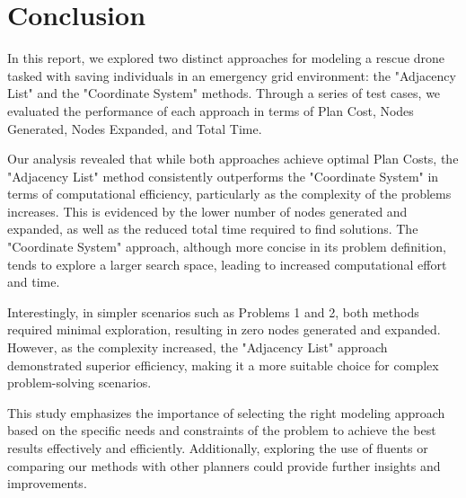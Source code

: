 \documentclass{article}
\begin{document}
\section{Conclusion}

In this report, we explored two distinct approaches for modeling a rescue drone tasked with saving individuals in an emergency grid environment: the "Adjacency List" and the "Coordinate System" methods. Through a series of test cases, we evaluated the performance of each approach in terms of Plan Cost, Nodes Generated, Nodes Expanded, and Total Time.

\vspace{1em}

Our analysis revealed that while both approaches achieve optimal Plan Costs, the "Adjacency List" method consistently outperforms the "Coordinate System" in terms of computational efficiency, particularly as the complexity of the problems increases. This is evidenced by the lower number of nodes generated and expanded, as well as the reduced total time required to find solutions. The "Coordinate System" approach, although more concise in its problem definition, tends to explore a larger search space, leading to increased computational effort and time.

\vspace{1em}

Interestingly, in simpler scenarios such as Problems 1 and 2, both methods required minimal exploration, resulting in zero nodes generated and expanded. However, as the complexity increased, the "Adjacency List" approach demonstrated superior efficiency, making it a more suitable choice for complex problem-solving scenarios.

\vspace{1em}

This study emphasizes the importance of selecting the right modeling approach based on the specific needs and constraints of the problem to achieve the best results effectively and efficiently. Additionally, exploring the use of fluents or comparing our methods with other planners could provide further insights and improvements.
\end{document}
